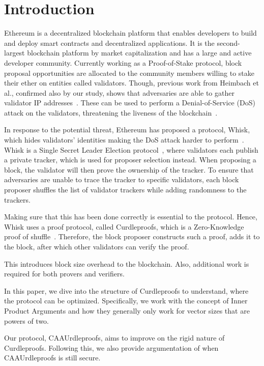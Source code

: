 

\section{Introduction}\label{sec:introduction}
Ethereum is a decentralized blockchain platform that enables developers to build and deploy smart contracts and decentralized applications.
It is the second-largest blockchain platform by market capitalization and has a large and active developer community.
Currently working as a Proof-of-Stake protocol, block proposal opportunities are allocated to the community members willing to stake their ether on entities called validators.
Though, previous work from Heimbach et al., confirmed also by our study, shows that adversaries are able to gather validator IP addresses~\cite{heimbach2024deanonymizingethereumvalidatorsp2p,ouroldpaper}.
These can be used to perform a Denial-of-Service (DoS) attack on the validators, threatening the liveness of the blockchain~\cite{EthereumAttackDefense2024,ouroldpaper}.

In response to the potential threat, Ethereum has proposed a protocol, Whisk, which hides validators' identities making the DoS attack harder to perform~\cite{Whisk2024}.
Whisk is a Single Secret Leader Election protocol~\cite{10.1145/3419614.3423258}, where validators each publish a private tracker, which is used for proposer selection instead.
When proposing a block, the validator will then prove the ownership of the tracker.
To ensure that adversaries are unable to trace the tracker to specific validators, each block proposer shuffles the list of validator trackers while adding randomness to the trackers.

Making sure that this has been done correctly is essential to the protocol.
Hence, Whisk uses a proof protocol, called Curdleproofs, which is a Zero-Knowledge proof of shuffle~\cite{Curdleproofs}.
Therefore, the block proposer constructs such a proof, adds it to the block, after which other validators can verify the proof.

This introduces block size overhead to the blockchain.
Also, additional work is required for both provers and verifiers.

In this paper, we dive into the structure of Curdleproofs to understand, where the protocol can be optimized.
Specifically, we work with the concept of Inner Product Arguments and how they generally only work for vector sizes that are powers of two.

Our protocol, CAAUrdleproofs, aims to improve on the rigid nature of Curdleproofs.
Following this, we also provide argumentation of when CAAUrdleproofs is still secure.

